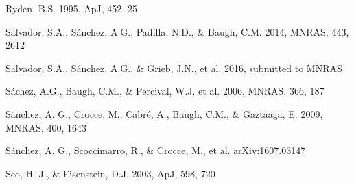 \documentclass[iop]{emulateapj}
\begin{document}
\begin{thebibliography}{}



Ryden, B.S. 1995, ApJ, 452, 25  



Salvador, S.A., S\'{a}nchez, A.G., Padilla, N.D., \& Baugh, C.M. 2014, MNRAS, 443, 2612

Salvador, S.A., S\'{a}nchez, A.G., \& Grieb, J.N., et al. 2016, submitted to MNRAS

S\'{a}chez, A.G., Baugh, C.M., \& Percival, W.J. et al. 2006, MNRAS, 366, 187

S\'{a}nchez, A. G., Crocce, M., Cabr\'{e}, A., Baugh, C.M., \& Gaztaaga, E. 2009, MNRAS, 400, 1643

S\'{a}nchez, A. G., Scoccimarro, R., \& Crocce, M., et al.
arXiv:1607.03147






Seo, H.-J., \& Eisenstein, D.J. 2003, ApJ, 598, 720




\end{thebibliography}
\end{document}
